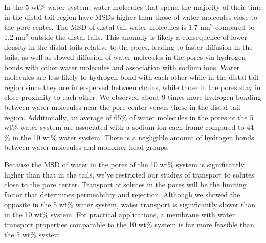 \documentclass[journal=jpcbfk,manuscript=article]{achemso}
\begin{document}
  In the 5 wt\% water system, water molecules that spend the majority of their 
  time in the distal tail region have MSDs higher than those of water molecules
  close to the pore center. The MSD of distal tail water molecules is 1.7 nm$^2$
  compared to 1.2 nm$^2$ outside the distal tails. This anomaly is likely a 
  consequence of lower density in the distal tails relative to the pores,
  leading to faster diffusion in the tails,
  as well as slowed diffusion of water molecules in the pores via hydrogen bonds
  with other water molecules and association with sodium ions. Water molecules 
  are less likely to hydrogen bond with each other while in the distal tail 
  region since they are interspersed between chains, while those in 
  the pores stay in close proximity to each other. We observed about 9 times more  %
  hydrogen bonding between water molecules near the pore center versus those in 
  the distal tail region. Additionally, an average of 65\% of water molecules in
  the pores of the 5 wt\% water system are associated with a sodium ion each frame
  compared to 44 \% in the 10 wt\% water system. There is a negligible amount of
  hydrogen bonds between water molecules and monomer head groups. 
  
  Because the MSD of water in the pores of the 10 wt\% system is significantly
  higher than that in the tails, we've restricted our studies of transport to 
  solutes close to the pore center. Transport of solutes in the pores will be the 
  limiting factor that determines permeability and rejection. Although we showed
  the opposite in the 5 wt\% water system, water transport is significantly slower
  than in the 10 wt\% system. For practical applications, a membrane with water 
  transport properties comparable to the 10 wt\% system is far more feasible than
  the 5 wt\% system.
 
%  
%
%
%
\end{document}
